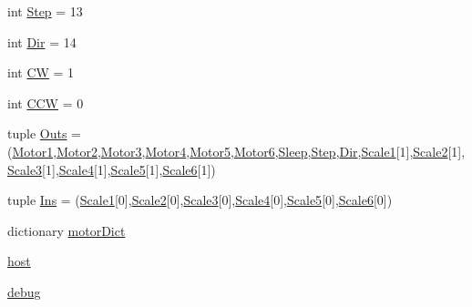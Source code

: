 \begin{DoxyCompactItemize}
int \hyperlink{namespaceserver_aba54319f3418fd1254cd1a9d39ca6537}{Step} = 13
\item 
int \hyperlink{namespaceserver_afb36e81e6eaa02caf41d039c7a0114cc}{Dir} = 14
\item 
int \hyperlink{namespaceserver_a6c8933b71a15889c3d5e31d1b3564d7b}{CW} = 1
\item 
int \hyperlink{namespaceserver_af5d52290ad2dff8fac13151fb066070c}{C\+CW} = 0
\item 
tuple \hyperlink{namespaceserver_aaabb4b971ab7664a476a58c39ed286f1}{Outs} = (\hyperlink{namespaceserver_abf30f8bded9f548505f3493c335f2106}{Motor1},\hyperlink{namespaceserver_a00295ebb36b4f5010bd865f7f79ed840}{Motor2},\hyperlink{namespaceserver_ab9a64d256e338e60c642657f058fe711}{Motor3},\hyperlink{namespaceserver_afdb0b7fd94db47ff97518c814a37d65b}{Motor4},\hyperlink{namespaceserver_a7ecb18c069c04be820a9f13b78239ad7}{Motor5},\hyperlink{namespaceserver_a920ae2aa2476b38b98339a8c31a83250}{Motor6},\hyperlink{namespaceserver_afe680556fcbe382c4d1704864d6fdccb}{Sleep},\hyperlink{namespaceserver_aba54319f3418fd1254cd1a9d39ca6537}{Step},\hyperlink{namespaceserver_afb36e81e6eaa02caf41d039c7a0114cc}{Dir},\hyperlink{namespaceserver_a4dc79f107ff469954b71e2721c2e52b5}{Scale1}\mbox{[}1\mbox{]},\hyperlink{namespaceserver_ab1c92a82b94362f20e2d00d9447f5490}{Scale2}\mbox{[}1\mbox{]},\hyperlink{namespaceserver_afd40f5f5a35ccf0b353b7d4553df34b8}{Scale3}\mbox{[}1\mbox{]},\hyperlink{namespaceserver_af086972c970a98d91c403e604c9637e2}{Scale4}\mbox{[}1\mbox{]},\hyperlink{namespaceserver_ad6bed8ab0f9fed142bef6040df907d79}{Scale5}\mbox{[}1\mbox{]},\hyperlink{namespaceserver_a85cc9bc47652d356467966a1c5a31b77}{Scale6}\mbox{[}1\mbox{]})
\item 
tuple \hyperlink{namespaceserver_a5cf9fd65fb4b3db36e9347a8000d6105}{Ins} = (\hyperlink{namespaceserver_a4dc79f107ff469954b71e2721c2e52b5}{Scale1}\mbox{[}0\mbox{]},\hyperlink{namespaceserver_ab1c92a82b94362f20e2d00d9447f5490}{Scale2}\mbox{[}0\mbox{]},\hyperlink{namespaceserver_afd40f5f5a35ccf0b353b7d4553df34b8}{Scale3}\mbox{[}0\mbox{]},\hyperlink{namespaceserver_af086972c970a98d91c403e604c9637e2}{Scale4}\mbox{[}0\mbox{]},\hyperlink{namespaceserver_ad6bed8ab0f9fed142bef6040df907d79}{Scale5}\mbox{[}0\mbox{]},\hyperlink{namespaceserver_a85cc9bc47652d356467966a1c5a31b77}{Scale6}\mbox{[}0\mbox{]})
\item 
dictionary \hyperlink{namespaceserver_a8cdf5bf3b7e067152c8db6bf72cfd6c7}{motor\+Dict}
\item 
\hyperlink{namespaceserver_ae9fe947fe8af0c8524c72b5978fe9ef7}{host}
\item 
\hyperlink{namespaceserver_a43e48d45560e05a17f4716d8b28aa82a}{debug}
\end{DoxyCompactItemize}


